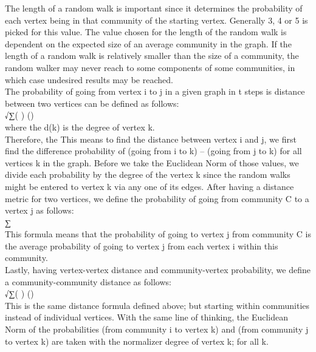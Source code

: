 \documentclass[10pt]{article}
\begin{document}
The length of a random walk is important since it determines the probability of each vertex being in that community of the starting vertex. Generally 3, 4 or 5 is picked for this value. The value chosen for the length of the random walk is dependent on the expected size of an average community in the graph. If the length of a random walk is relatively smaller than the size of a community, the random walker may never reach to some components of some communities, in which case undesired results may be reached. \\

The probability of going from vertex i to j in a given graph in t steps is distance between two vertices can be defined as follows: \\

√∑( ) () \\

where the d(k) is the degree of vertex k. \\

Therefore, the 
  This means to find the distance between vertex i and j, we first find the difference probability of (going from i to k) – (going from j to k) for all vertices k in the graph. Before we take the Euclidean Norm of those values, we divide each probability by the degree of the vertex k since the random walks might be entered to vertex k via any one of its edges.
After having a distance metric for two vertices, we define the probability of going from community C to a vertex j as follows: \\

∑ \\

This formula means that the probability of going to vertex j from community C is the average probability of going to vertex j from each vertex i within this community. \\

Lastly, having vertex-vertex distance and community-vertex probability, we define a community-community distance as follows: \\

√∑( ) () \\

This is the same distance formula defined above; but starting within communities instead of individual vertices. With the same line of thinking, the Euclidean Norm of the probabilities (from community i to vertex k) and (from community j to vertex k) are taken with the normalizer degree of vertex k; for all k. \\
\end{document}
